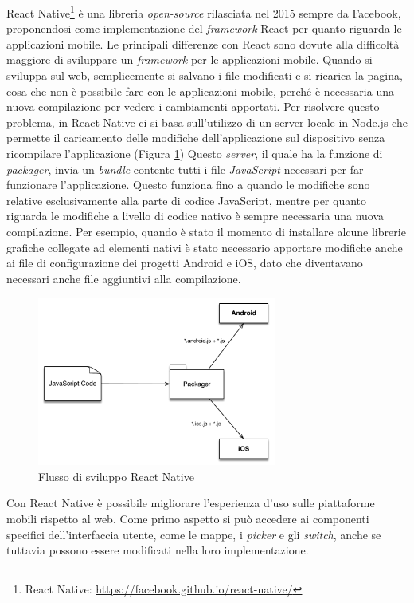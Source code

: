 React Native\footnote{React Native: \url{https://facebook.github.io/react-native/}} è una libreria \emph{open-source} rilasciata nel 2015 sempre da Facebook, proponendosi come implementazione del \emph{framework} React per quanto riguarda le applicazioni mobile.
Le principali differenze con React sono dovute alla difficoltà maggiore di sviluppare un \emph{framework} per le applicazioni mobile. 
Quando si sviluppa sul web, semplicemente si salvano i file modificati e si ricarica la pagina, cosa che non è possibile fare con le applicazioni mobile, perché è necessaria una nuova compilazione per vedere i cambiamenti apportati.
Per risolvere questo problema, in React Native ci si basa sull'utilizzo di un server locale in Node.js che permette il caricamento delle modifiche dell'applicazione sul dispositivo senza ricompilare l'applicazione (Figura \ref{fig:flusso-sviluppo-react-native}) Questo \emph{server}, il quale ha la funzione di \emph{packager}, invia un \emph{bundle} contente tutti i file \emph{JavaScript} necessari per far funzionare l'applicazione. Questo funziona fino a quando le modifiche sono relative esclusivamente alla parte di codice JavaScript, mentre per quanto riguarda le modifiche a livello di codice nativo è sempre necessaria una nuova compilazione. Per esempio, quando è stato il momento di installare alcune librerie grafiche collegate ad elementi nativi è stato necessario apportare modifiche anche ai file di configurazione dei progetti Android e iOS, dato che diventavano necessari anche file aggiuntivi alla compilazione.

\begin{figure}[ht]
	\centering
	\includegraphics[width=0.7\textwidth]{6-implementazione-app/immagini/flusso-sviluppo-react-native.pdf}
	\caption{Flusso di sviluppo React Native\label{fig:flusso-sviluppo-react-native}}
\end{figure}

Con React Native è possibile migliorare l'esperienza d'uso sulle piattaforme mobili rispetto al web. Come primo aspetto si può accedere ai componenti specifici dell'interfaccia utente, come le mappe, i \emph{picker} e gli \emph{switch}, anche se tuttavia possono essere modificati nella loro implementazione.

